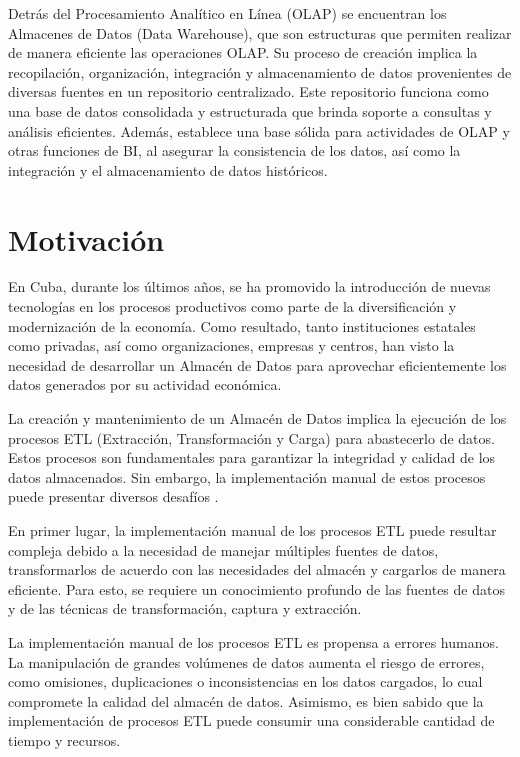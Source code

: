 Detrás del Procesamiento Analítico en Línea (OLAP) se encuentran los Almacenes de Datos (Data Warehouse), que son 
estructuras que permiten realizar de manera eficiente las operaciones OLAP. Su proceso de creaci\'on implica la 
recopilación, 
organización, integración y almacenamiento de datos provenientes de diversas fuentes en un repositorio centralizado. Este 
repositorio funciona como una base de datos consolidada y estructurada que brinda soporte a consultas y análisis eficientes. 
Además, establece una base sólida para actividades de OLAP y otras funciones de BI, al 
asegurar la consistencia de los datos, así como la integración y el almacenamiento de datos históricos.

\section{Motivaci\'on}

En Cuba, durante los \'ultimos años, se ha promovido la introducción de nuevas tecnologías en los procesos 
productivos como parte de la diversificación y modernización de la economía. Como resultado, tanto instituciones 
estatales como privadas, así como organizaciones, empresas y centros, han visto la necesidad de desarrollar un Almac\'en 
de Datos para aprovechar eficientemente los datos generados por su actividad económica.

La creación y mantenimiento de un Almacén de Datos implica la ejecución de los procesos ETL (Extracción, Transformación y 
Carga) para abastecerlo de datos. Estos procesos son fundamentales para garantizar la integridad y calidad de los datos 
almacenados. Sin embargo, la implementación manual de estos procesos puede presentar diversos desafíos
\cite{nwokeji2021systematic, dhaouadi2022data, kimball2004data}.

En primer lugar, la implementación manual de los procesos ETL puede resultar compleja debido a la necesidad 
de manejar múltiples fuentes de datos, transformarlos de acuerdo con las necesidades del almacén y cargarlos de manera 
eficiente. Para esto, se requiere un conocimiento profundo de las fuentes de datos y de las técnicas de 
transformación, captura y extracción.

La implementación manual de los procesos ETL es propensa a errores humanos. La manipulación de grandes 
volúmenes de datos aumenta el riesgo de errores, como omisiones, duplicaciones o inconsistencias en los datos cargados, lo 
cual compromete la calidad del almac\'en de datos. Asimismo, es bien sabido que la implementación de procesos ETL puede consumir una 
considerable cantidad de tiempo y recursos.


